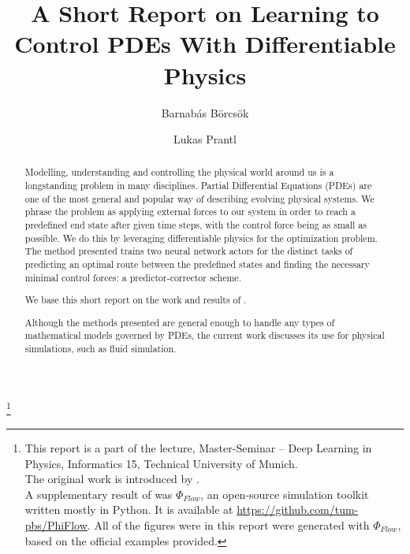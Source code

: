 \documentclass[acmtog]{techreportacmart}
\begin{document}
\title{A Short Report on Learning to Control PDEs With Differentiable Physics} 
\author{Barnab\'{a}s B\"{o}rcs\"{o}k}
\author{Lukas Prantl}

\renewcommand\shortauthors{Barnab\'{a}s B\"{o}rcs\"{o}k}

\begin{abstract}
  Modelling, understanding and controlling the physical world around us is
  a longstanding problem in many disciplines. Partial Differential Equations
  (PDEs) are one of the most general and popular way of describing evolving
  physical systems. We phrase the problem as applying external forces to our
  system in order to reach a predefined end state after given time steps, with
  the control force being as small as possible. We do this by leveraging
  differentiable physics for the optimization problem. The method presented 
  trains two neural network actors for the distinct tasks of predicting an
  optimal route between the predefined states and finding the necessary minimal
  control forces: a predictor-corrector scheme.

  We base this short report on the work and results of \cite{ControlPDEs}. 

  Although the methods presented are general enough to handle any types of
  mathematical models governed by PDEs, the current work discusses its use for
  physical simulations, such as fluid simulation. 
\end{abstract}



\thanks{This report is a part of the lecture, Master-Seminar -- Deep Learning in
  Physics, Informatics 15, Technical University of Munich.\\

The original work is introduced by \cite{ControlPDEs}.\\

A supplementary result of \cite{ControlPDEs} was $\Phi_{Flow}$, an open-source
simulation toolkit written mostly in Python. It is available at 
\url{https://github.com/tum-pbs/PhiFlow}. All of the figures were in this report
were generated with $\Phi_{Flow}$, based on the official examples provided. 
}

\maketitle
\end{document}
